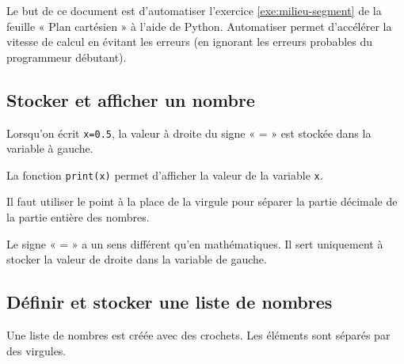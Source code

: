 

\usepackage{minted}

\AdvanceDate[0]


\pagestyle{fancy}
\fancyhead[R]{\today}

Le but de ce document est d'automatiser l'exercice \ref{exe:milieu-segment} de la feuille « Plan cartésien » à l'aide de Python.
Automatiser permet d'accélérer la vitesse de calcul en évitant les erreurs (en ignorant les erreurs probables du programmeur débutant).

\setcounter{Exercise}{9}


\setlength\columnsep{30pt}

\subsection*{Stocker et afficher un nombre}

\begin{multicols}{3}
	\noindent
	Lorsqu'on écrit \texttt{x=0.5}, la valeur à droite du signe « = » est stockée dans la variable à gauche.
	
	\noindent
	La fonction \texttt{print(x)} permet d'afficher la valeur de la variable \texttt{x}.

	\columnbreak
	\centering
	\begin{minipage}{.1\textwidth}
	\end{minipage}
\end{multicols}

\warning Il faut utiliser le point à la place de la virgule pour séparer la partie décimale de la partie entière des nombres.

\warning Le signe « = » a un sens différent qu'en mathématiques. Il sert uniquement à stocker la valeur de droite dans la variable de gauche.


\subsection*{Définir et stocker une liste de nombres}

\begin{multicols}{2}
	Une liste de nombres est créée avec des crochets. Les éléments sont séparés par des virgules.

	\columnbreak
	\centering
	\begin{minipage}{.2\textwidth}
	\end{minipage}
\end{multicols}

